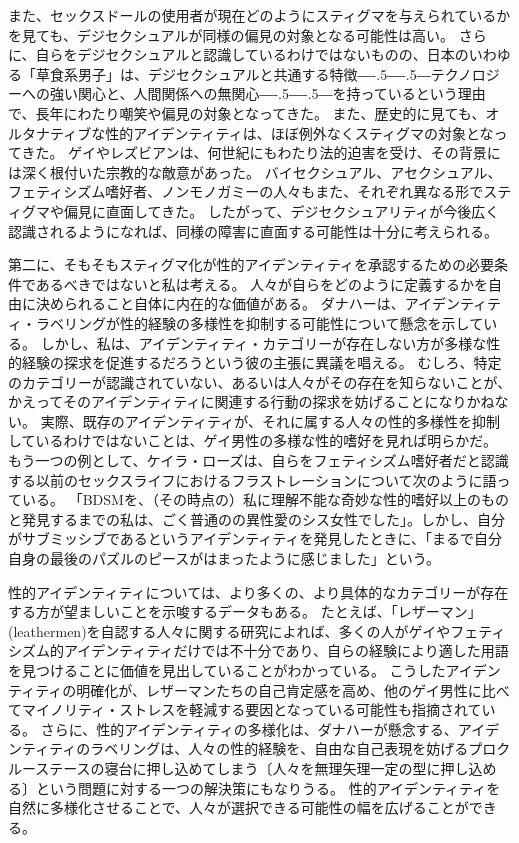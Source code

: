 \documentclass[paper=a4,book,openany]{jlreq}
\def\DDASH{―\kern-.5\zw―\kern-.5\zw―} %
\begin{document}
また、セックスドールの使用者が現在どのようにスティグマを与えられているかを見ても、デジセクシュアルが同様の偏見の対象となる可能性は高い\citep{knox17:_sex_dolls}。
さらに、自らをデジセクシュアルと認識しているわけではないものの、日本のいわゆる「草食系男子」は、デジセクシュアルと共通する特徴{\DDASH}テクノロジーへの強い関心と、人間関係への無関心{\DDASH}を持っているという理由で、長年にわたり嘲笑や偏見の対象となってきた\citep{harney09:_herbiv_dilem}。
また、歴史的に見ても、オルタナティブな性的アイデンティティは、ほぼ例外なくスティグマの対象となってきた。
ゲイやレズビアンは、何世紀にもわたり法的迫害を受け、その背景には深く根付いた宗教的な敵意があった。
バイセクシュアル、アセクシュアル、フェティシズム嗜好者、ノンモノガミーの人々もまた、それぞれ異なる形でスティグマや偏見に直面してきた\citep{klein06:_sm_sadom_inter_issue_child_custod_proceed,wright06:_discr_sm_ident_indiv,balzarini18:_dimmin_halo_aroun_monog,rothblum20:_asexual_non_asexual_respon_u}。
したがって、デジセクシュアリティが今後広く認識されるようになれば、同様の障害に直面する可能性は十分に考えられる。

第二に、そもそもスティグマ化が性的アイデンティティを承認するための必要条件であるべきではないと私は考える。
人々が自らをどのように定義するかを自由に決められること自体に内在的な価値がある。
ダナハーは、アイデンティティ・ラベリングが性的経験の多様性を抑制する可能性について懸念を示している。
しかし、私は、アイデンティティ・カテゴリーが存在しない方が多様な性的経験の探求を促進するだろうという彼の主張に異議を唱える。
むしろ、特定のカテゴリーが認識されていない、あるいは人々がその存在を知らないことが、かえってそのアイデンティティに関連する行動の探求を妨げることになりかねない。
実際、既存のアイデンティティが、それに属する人々の性的多様性を抑制しているわけではないことは、ゲイ男性の多様な性的嗜好を見れば明らかだ。
もう一つの例として、ケイラ・ローズは、自らをフェティシズム嗜好者だと認識する以前のセックスライフにおけるフラストレーションについて次のように語っている。
「BDSMを、（その時点の）私に理解不能な奇妙な性的嗜好以上のものと発見するまでの私は、ごく普通のの異性愛のシス女性でした」。しかし、自分がサブミッシブであるというアイデンティティを発見したときに、「まるで自分自身の最後のパズルのピースがはまったように感じました」という\citep{lords:sexual_submission}。

性的アイデンティティについては、より多くの、より具体的なカテゴリーが存在する方が望ましいことを示唆するデータもある。
たとえば、「レザーマン」(leathermen)を自認する人々に関する研究によれば、多くの人がゲイやフェティシズム的アイデンティティだけでは不十分であり、自らの経験により適した用語を見つけることに価値を見出していることがわかっている\citep{kamel80:_leath}。
こうしたアイデンティティの明確化が、レザーマンたちの自己肯定感を高め、他のゲイ男性に比べてマイノリティ・ストレスを軽減する要因となっている可能性も指摘されている\citep{mosher16:_layer_leath,tatum16:_proxim_minor_stres_proces_subjec}。
さらに、性的アイデンティティの多様化は、ダナハーが懸念する、アイデンティティのラベリングは、人々の性的経験を、自由な自己表現を妨げるプロクルーステースの寝台に押し込めてしまう〔人々を無理矢理一定の型に押し込める〕という問題に対する一つの解決策にもなりうる。
性的アイデンティティを自然に多様化させることで、人々が選択できる可能性の幅を広げることができる。
\end{document}
